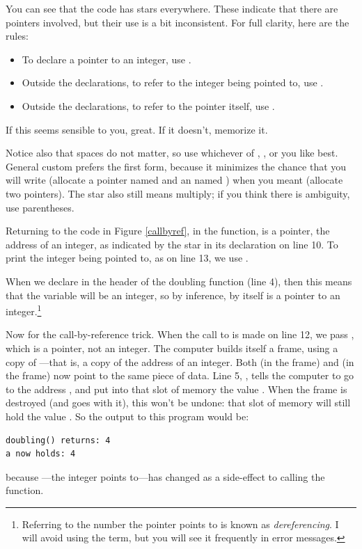 \documentclass[12pt]{article}
\begin{document}
\lstset{numbers=left, numberstyle=\scshape}
\lstset{numbers=none}

You can see that the code has stars everywhere. These
indicate that there are pointers involved, but their use is a bit inconsistent.
For full clarity, here are the rules:
\begin{itemize}
\item To declare a pointer to an integer, use .
\item Outside the declarations, to refer to the integer being pointed to, use .
\item Outside the declarations, to refer to the pointer itself, use
.
\end{itemize}
If this seems sensible to you, great. If it doesn't, memorize it. 

Notice also that spaces do not matter, so use whichever of , , or  you like best. General
custom prefers the first form, because it minimizes the chance that you
will write  (allocate a pointer named 
and an  named ) when you meant  (allocate two pointers). The star also
still means multiply; if you think there is ambiguity, use parentheses.

Returning to the code in Figure \ref{callbyref}, in the 
function,  is a pointer, the address of an integer, as
indicated by the star in its declaration on line 10. To print the integer
being pointed to, as on line 13, we use .

When we declare  in the header of the doubling
function (line 4), then this means that the variable  will be an
integer, so by inference,  by itself is a pointer to an
integer.\footnote{Referring to the number the pointer points to is
known as {\sl dereferencing}. I will avoid using the term, but you will see it frequently in error messages.}

Now for the call-by-reference trick.  When the call to 
is made on line 12, we pass , which is a pointer, not
an integer. The computer builds itself a frame, using a copy of
---that is, a copy of the address of an integer. Both
 (in the  frame) and  (in the
 frame) now point to the same piece of data.  Line 5,
, tells the computer to go to the address
, and put into that slot of memory the value . When the frame is destroyed (and  goes with it),
this won't be undone: that slot of memory will still hold the value
.  So the output to this program would be: 
\begin{verbatim} 
doubling() returns: 4
a now holds: 4
\end{verbatim} 
because ---the integer  points to---has changed as a
side-effect to calling the  function.
\end{document}
